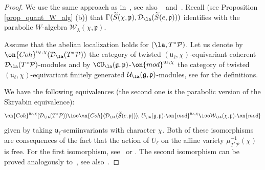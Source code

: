 \documentclass[12pt]{amsart}
\begin{document}
 \begin{proof}
    We use the same approach as in~\cite[Propositions~3.7,~3.8]{Losev_cacticells}, see also ~\cite{Gi} and~\cite{dk}. Recall (see Proposition \ref{prop_quant_W_alg} (b))
 that $\Gamma(\widetilde{S}(\chi,\mathfrak{p}),\mathcal{D}_{\la}(\widetilde{S}(e,\mathfrak{p})))$ identifies with the %
 parabolic $W$-algebra $\mathcal{W}_{\lambda}(\chi,\mathfrak{p})$. 
  
    
    Assume that the abelian localization holds for $(\la,T^*\mathcal{P})$. 
    Let us denote by $\on{Coh}^{\mathfrak{u}_{\ell},\chi}(\mathcal{D}_{\la}(T^*\mathcal{P}))$ the category of twisted $(\mathfrak{u}_{\ell},\chi)$-equivariant coherent %
    $\mathcal{D}_{\la}(T^*\mathcal{P})$-modules and by $\CU_{\la}(\mathfrak{g},\mathfrak{p})$-$\on{mod}^{\mathfrak{u}_{\ell},\chi}$ the category of twisted $(\mathfrak{u}_{\ell},\chi)$-equivariant finitely generated $\mathcal{U}_{\la}(\mathfrak{g},\mathfrak{p})$-modules, see \cite[Section 4]{Kashiwara_Dmod} for the definitions. 
    
    
    We have the following  equivalences (the second one is the parabolic version of the Skryabin equivalence): 
    \begin{equation}\label{G/Q_to_W_mod}
    \on{Coh}^{\mathfrak{u}_{\ell},\chi}(\mathcal{D}_\la(T^*\mathcal{P})) \iso \on{Coh}(\mathcal{D}_{\la}(\widetilde{S}(e,\mathfrak{p}))),\,  
    U_{\la}(\mathfrak{g},\mathfrak{p})\text{-}\on{mod}^{\mathfrak{u}_{\ell},\chi} \iso
    \mathcal{W}_{\la}(\chi,\mathfrak{p})\text{-}\on{mod}
    \end{equation}
    given by taking $\mathfrak{u}_\ell$-semiinvariants with character $\chi$. Both of these isomorphisms are consequences of the fact that the action of $U_\ell$ on the affine variety $\mu_{T^*\mathcal{P}}^{-1}(\chi)$ is free. For the first isomorphism, see~\cite[Lemma~5.3]{dk} or \cite[Proposition~2.8]{kr}. The second isomorphism can be proved analogously  to~\cite[Section 6.2]{GanGinzburg}, see also~\cite{sk}. 
    


\end{proof}
\end{document}
